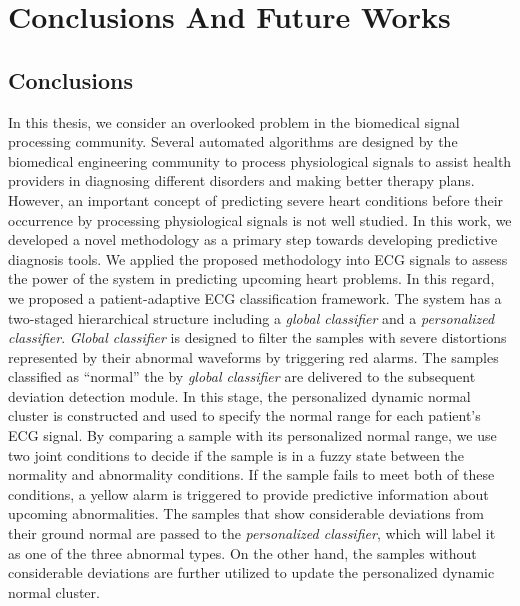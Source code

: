  \chapter{Conclusions And Future Works} \label{ch:Discussion And Resuls}
 
\section{Conclusions}
In this thesis, we consider an overlooked problem in the biomedical signal processing community. Several automated algorithms are designed by the biomedical engineering community to process physiological signals to assist health providers in diagnosing different disorders and making better therapy plans. However, an important concept of predicting severe heart conditions before their occurrence by processing physiological signals is not well studied. In this work, we developed a novel methodology as a primary step towards developing predictive diagnosis tools. We applied the proposed methodology into ECG signals to assess the power of the system in predicting upcoming heart problems.  
In this regard, we proposed a patient-adaptive ECG classification framework. The system has a two-staged hierarchical structure including a \textit{global classifier} and a \textit{personalized classifier}. \textit{Global classifier} is designed to filter the samples with severe distortions represented by their abnormal waveforms by triggering red alarms. The samples classified as ``normal'' the by \textit{global classifier} are delivered to the subsequent deviation detection module. In this stage, the personalized dynamic normal cluster is constructed and used to specify the normal range for each patient's ECG signal. By comparing a sample with its personalized normal range, we use two joint conditions to decide if the sample is in a fuzzy state between the normality and abnormality conditions. If the sample fails to meet both of these conditions, a yellow alarm is triggered to provide predictive information about upcoming abnormalities. The samples that show considerable deviations from their ground normal are passed to the \textit{personalized classifier}, which will label it as one of the three abnormal types. On the other hand, the samples without considerable deviations are further utilized to update the personalized dynamic normal cluster.

